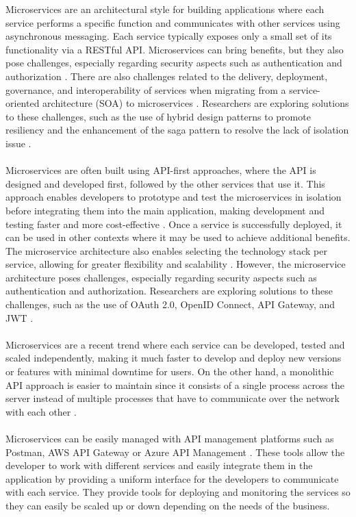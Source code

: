 \documentclass[BIF,Bachelor,nenglish]{twbook}%
\begin{document}
\noindent
Microservices are an architectural style for building applications where each service performs a specific function and communicates with other services using asynchronous messaging. Each service typically exposes only a small set of its functionality via a RESTful API. Microservices can bring benefits, but they also pose challenges, especially regarding security aspects such as authentication and authorization \cite{alm2022} . There are also challenges related to the delivery, deployment, governance, and interoperability of services when migrating from a service-oriented architecture (SOA) to microservices\cite{raj2021} . Researchers are exploring solutions to these challenges, such as the use of hybrid design patterns to promote resiliency and the enhancement of the saga pattern to resolve the lack of isolation issue \cite{ras2022, dar2022} .
\\
\\
Microservices are often built using API-first approaches, where the API is designed and developed first, followed by the other services that use it. This approach enables developers to prototype and test the microservices in isolation before integrating them into the main application, making development and testing faster and more cost-effective \cite{alm2022} . Once a service is successfully deployed, it can be used in other contexts where it may be used to achieve additional benefits. The microservice architecture also enables selecting the technology stack per service, allowing for greater flexibility and scalability \cite{dar2022} . However, the microservice architecture poses challenges, especially regarding security aspects such as authentication and authorization. Researchers are exploring solutions to these challenges, such as the use of OAuth 2.0, OpenID Connect, API Gateway, and JWT \cite{alm2022} .
\\
\\
Microservices are a recent trend where each service can be developed, tested and scaled independently, making it much faster to develop and deploy new versions or features with minimal downtime for users. On the other hand, a monolithic API approach is easier to maintain since it consists of a single process across the server instead of multiple processes that have to communicate over the network with each other \cite{pat2021}.
\\
\\
Microservices can be easily managed with API management platforms such as Postman, AWS API Gateway or Azure API Management \cite{postman, awsApiGateway, azureApiManagement} . These tools allow the developer to work with different services and easily integrate them in the application by providing a uniform interface for the developers to communicate with each service. They provide tools for deploying and monitoring the services so they can easily be scaled up or down depending on the needs of the business.
\end{document}
